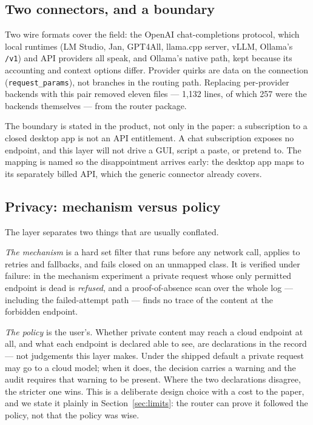 \documentclass[11pt]{article}
\newcommand{\code}[1]{\texttt{#1}}
\begin{document}
\subsection{Two connectors, and a boundary}

Two wire formats cover the field: the OpenAI chat-completions protocol, which local runtimes
(LM Studio, Jan, GPT4All, llama.cpp server, vLLM, Ollama's \code{/v1}) and API providers all
speak, and Ollama's native path, kept because its accounting and context options differ.
Provider quirks are data on the connection (\code{request\_params}), not branches in the routing
path. Replacing per-provider backends with this pair removed eleven files --- 1{,}132 lines, of
which 257 were the backends themselves --- from the router package.

The boundary is stated in the product, not only in the paper: a subscription to a closed desktop
app is not an API entitlement. A chat subscription exposes no endpoint, and this layer will not
drive a GUI, script a paste, or pretend to. The mapping is named so the disappointment arrives
early: the desktop app maps to its separately billed API, which the generic connector already
covers.

\subsection{Privacy: mechanism versus policy}

The layer separates two things that are usually conflated.

\emph{The mechanism} is a hard set filter that runs before any network call, applies to retries
and fallbacks, and fails closed on an unmapped class. It is verified under failure: in the
mechanism experiment a private request whose only permitted endpoint is dead is \emph{refused},
and a proof-of-absence scan over the whole log --- including the failed-attempt path --- finds no
trace of the content at the forbidden endpoint.

\emph{The policy} is the user's. Whether private content may reach a cloud endpoint at all, and
what each endpoint is declared able to see, are declarations in the record --- not judgements
this layer makes. Under the shipped default a private request may go to a cloud model; when it
does, the decision carries a warning and the audit requires that warning to be present. Where
the two declarations disagree, the stricter one wins. This is a deliberate design choice with a
cost to the paper, and we state it plainly in Section~\ref{sec:limits}: the router can prove it
followed the policy, not that the policy was wise.
\end{document}
